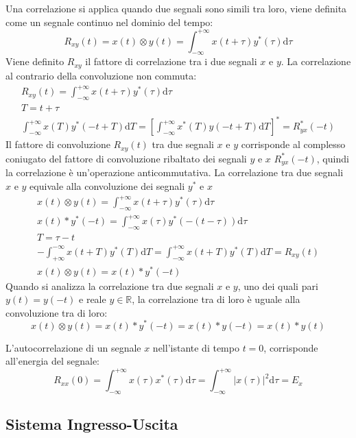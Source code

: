 \documentclass{article}
\newcommand{\df}{\mathrm{d}}
\numberwithin{equation}{subsection}
\begin{document}
Una correlazione si applica quando due segnali sono simili tra loro, viene definita come un segnale continuo nel dominio del tempo:
\begin{equation}
    R_{xy}(t)=x(t)\otimes y(t)=\int_{-\infty}^{+\infty}x(t+\tau)y^*(\tau)\df\tau
\end{equation}
Viene definito $R_{xy}$ il fattore di correlazione tra i due segnali $x$ e $y$. La correlazione al contrario della convoluzione non commuta:
\begin{gather*}
    \displaystyle R_{xy}(t)=\int_{-\infty}^{+\infty}x(t+\tau)y^*(\tau)\df\tau\\
    T=t+\tau\\
    \displaystyle\int_{-\infty}^{+\infty}x(T)y^*(-t+T)\df T=\left[\int_{-\infty}^{+\infty}x^*(T)y(-t+T)\df T\right]^*=R_{yx}^*(-t)
\end{gather*}
Il fattore di convoluzione $R_{xy}(t)$ tra due segnali $x$ e $y$ corrisponde al complesso coniugato del fattore di convoluzione ribaltato dei segnali $y$ e $x$ $R_{yx}^*(-t)$, 
quindi la correlazione è un'operazione anticommutativa. La correlazione tra due segnali $x$ e $y$ equivale alla convoluzione dei segnali $y^*$ e $x$
\begin{gather*}
    x(t)\otimes y(t)=\displaystyle\int_{-\infty}^{+\infty}x(t+\tau)y^*(\tau)\df\tau\\
    x(t)*y^*(-t)=\displaystyle\int_{-\infty}^{+\infty}x(\tau)y^*(-(t-\tau))\df\tau\\
    T=\tau-t\\
    -\int_{+\infty}^{-\infty}x(t+T)y^*(T)\df T=\int_{-\infty}^{+\infty}x(t+T)y^*(T)\df T=R_{xy}(t)\\
    x(t)\otimes y(t)=x(t)*y^*(-t)
\end{gather*}
Quando si analizza la correlazione tra due segnali $x$ e $y$, uno dei quali pari $y(t)=y(-t)$ e reale $y\in\mathbb{R}$, la correlazione tra di loro è uguale alla convoluzione 
tra di loro:
\begin{equation*}
    x(t)\otimes y(t)=x(t)*y^*(-t)=x(t)*y(-t)=x(t)*y(t)
\end{equation*}

L'autocorrelazione di un segnale $x$ nell'istante di tempo $t=0$, corrisponde all'energia del segnale:
\begin{equation*}
    R_{xx}(0)=\displaystyle\int_{-\infty}^{+\infty}x(\tau)x^*(\tau)\df\tau=\int_{-\infty}^{+\infty}|x(\tau)|^2\df\tau=E_x
\end{equation*}

\subsection{Sistema Ingresso-Uscita}
\end{document}
